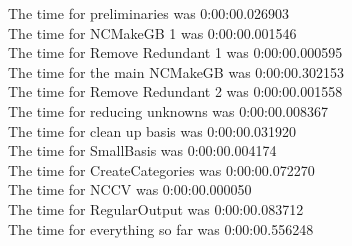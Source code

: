 \documentclass[rep10,leqno]{report}
\begin{document}
\noindent
The time for preliminaries was 0:00:00.026903\\
The time for NCMakeGB 1 was 0:00:00.001546\\
The time for Remove Redundant 1 was 0:00:00.000595\\
The time for the main NCMakeGB was 0:00:00.302153\\
The time for Remove Redundant 2 was 0:00:00.001558\\
The time for reducing unknowns was 0:00:00.008367\\
The time for clean up basis was 0:00:00.031920\\
The time for SmallBasis was 0:00:00.004174\\
The time for CreateCategories was 0:00:00.072270\\
The time for NCCV was 0:00:00.000050\\
The time for RegularOutput was 0:00:00.083712\\
The time for everything so far was 0:00:00.556248\\
\end{document}
